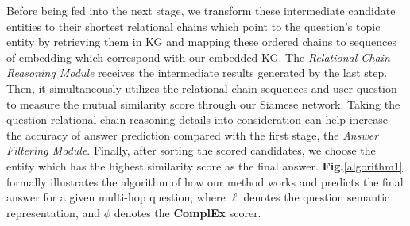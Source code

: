 \documentclass[pdflatex,sn-mathphys]{sn-jnl}%
\theoremstyle{thmstyleone}%
\theoremstyle{thmstyletwo}%
\theoremstyle{thmstylethree}%
\begin{document}
Before being fed into the next stage, we transform these intermediate candidate entities to their shortest relational chains which point to the question's topic entity by retrieving them in KG and mapping these ordered chains to sequences of embedding which correspond with our embedded KG. The \textit{Relational Chain Reasoning Module} receives the intermediate results generated by the last step. Then, it simultaneously utilizes the relational chain sequences and user-question to measure the mutual similarity score through our Siamese network. Taking the question relational chain reasoning details into consideration can help increase the accuracy of answer prediction compared with the first stage, the \textit{Answer Filtering Module}. Finally, after sorting the scored candidates, we choose the entity which has the highest similarity score as the final answer. \textbf{Fig.}\ref{algorithm1} formally illustrates the algorithm of how our method works and predicts the final answer for a given multi-hop question, where $\ell$ denotes the question semantic representation, and $\phi$ denotes the \textbf{ComplEx} scorer.
\end{document}
